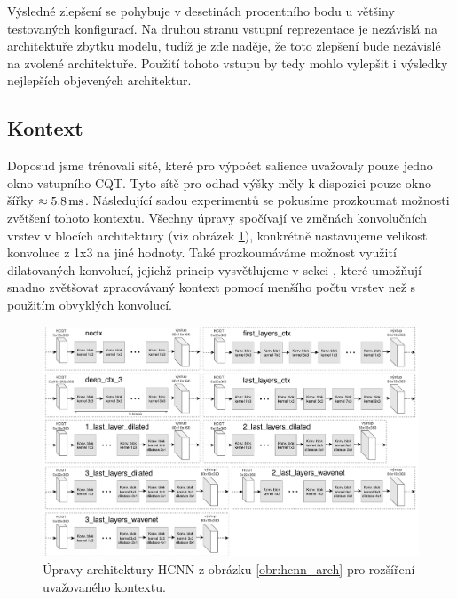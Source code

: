 Výsledné zlepšení se pohybuje v desetinách procentního bodu u většiny testovaných konfigurací. Na druhou stranu vstupní reprezentace je nezávislá na architektuře zbytku modelu, tudíž je zde naděje, že toto zlepšení bude nezávislé na zvolené architektuře. Použití tohoto vstupu by tedy mohlo vylepšit i výsledky nejlepších objevených architektur.




\subsection{Kontext}

Doposud jsme trénovali sítě, které pro výpočet salience uvažovaly pouze jedno okno vstupního CQT. Tyto sítě pro odhad výšky měly k dispozici pouze okno šířky $\approx 5.8\,\rm ms$. Následující sadou experimentů se pokusíme prozkoumat možnosti zvětšení tohoto kontextu. Všechny úpravy spočívají ve změnách konvolučních vrstev v blocích architektury (viz obrázek \ref{obr:hcnn_context_archs}), konkrétně nastavujeme velikost konvoluce z 1x3 na jiné hodnoty. Také prozkoumáváme možnost využití dilatovaných konvolucí, jejichž princip vysvětlujeme v sekci , které umožňují snadno zvětšovat zpracovávaný kontext pomocí menšího počtu vrstev než s použitím obvyklých konvolucí.

\begin{figure}[h]\centering
    \includegraphics[width=\textwidth,height=\textheight,keepaspectratio]{../img/hcnn_context_archs_4_grey}
\caption{Úpravy architektury HCNN z obrázku \ref{obr:hcnn_arch} pro rozšíření uvažovaného kontextu.}\label{obr:hcnn_context_archs}
\end{figure}

